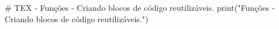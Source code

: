 # TEX - Funções - Criando blocos de código reutilizáveis.
print("Funções - Criando blocos de código reutilizáveis.")
